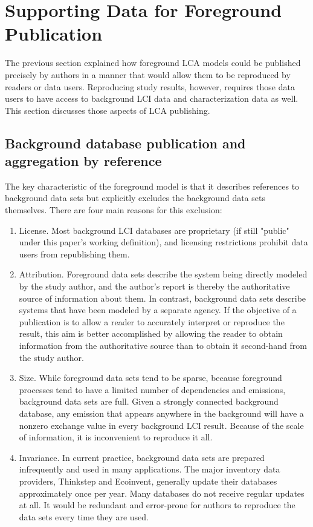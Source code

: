 \section{Supporting Data for Foreground Publication}

The previous section explained how foreground LCA models could be published precisely by authors in a manner that would allow them to be reproduced by readers or data users.  Reproducing study results, however, requires those data users to have access to background LCI data and characterization data as well.  This section discusses those aspects of LCA publishing.


\subsection{Background database publication and aggregation by reference}

The key characteristic of the foreground model is that it describes references to background data sets but explicitly excludes the background data sets themselves.  There are four main reasons for this exclusion:

\begin{enumerate}
\item License.  Most background LCI databases are proprietary (if still "public" under this paper's working definition), and licensing restrictions prohibit data users from republishing them.  

\item Attribution.  Foreground data sets describe the system being directly modeled by the study author, and the author's report is thereby the authoritative source of information about them. In contrast, background data sets describe systems that have been modeled by a separate agency.  If the objective of a publication is to allow a reader to accurately interpret or reproduce the result, this aim is better accomplished by allowing the reader to obtain information from the authoritative source than to obtain it second-hand from the study author.

\item Size.  While foreground data sets tend to be sparse, because foreground processes tend to have a limited number of dependencies and emissions, background data sets are full.  Given a strongly connected background database, any emission that appears anywhere in the background will have a nonzero exchange value in every background LCI result.  Because of the scale of information, it is inconvenient to reproduce it all.

\item Invariance.  In current practice, background data sets are prepared infrequently and used in many applications.  The major inventory data providers, Thinkstep and Ecoinvent, generally update their databases approximately once per year.  Many databases do not receive regular updates at all.  It would be redundant and error-prone for authors to reproduce the data sets every time they are used.
\end{enumerate}

